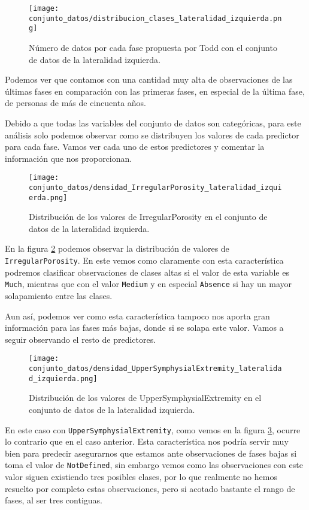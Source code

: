 \begin{figure}[H]
	\centering
	\texttt{[image: conjunto\_datos/distribucion\_clases\_lateralidad\_izquierda.png]}
	\caption{Número de datos por cada fase propuesta por Todd con el conjunto de datos de la lateralidad izquierda.}
	\label{fig:conteo_l0}
\end{figure}

Podemos ver que contamos con una cantidad muy alta de observaciones de las últimas fases en comparación con las primeras fases, en especial de la última fase, de personas de más de cincuenta años.

Debido a que todas las variables del conjunto de datos son categóricas, para este análisis solo podemos observar como se distribuyen los valores de cada predictor para cada fase. Vamos ver cada uno de estos predictores y comentar la información que nos proporcionan.

\begin{figure}[H]
	\centering
	\texttt{[image: conjunto\_datos/densidad\_IrregularPorosity\_lateralidad\_izquierda.png]}
	\caption{Distribución de los valores de IrregularPorosity en el conjunto de datos de la lateralidad izquierda.}
	\label{fig:densidad_IrregularPorosity_lateralidad_izquierda}
\end{figure}

En la figura \ref{fig:densidad_IrregularPorosity_lateralidad_izquierda} podemos observar la distribución de valores de \texttt{IrregularPorosity}. En este vemos como claramente con esta característica podremos clasificar observaciones de clases altas si el valor de esta variable es \texttt{Much}, mientras que con el valor \texttt{Medium} y en especial \texttt{Absence} si hay un mayor solapamiento entre las clases.

Aun así, podemos ver como esta característica tampoco nos aporta gran información para las fases más bajas, donde si se solapa este valor. Vamos a seguir observando el resto de predictores.

\begin{figure}[H]
	\centering
	\texttt{[image: conjunto\_datos/densidad\_UpperSymphysialExtremity\_lateralidad\_izquierda.png]}
	\caption{Distribución de los valores de UpperSymphysialExtremity en el conjunto de datos de la lateralidad izquierda.}
	\label{fig:densidad_UpperSymphysialExtremity_lateralidad_izquierda}
\end{figure}

En este caso con \texttt{UpperSymphysialExtremity}, como vemos en la figura \ref{fig:densidad_UpperSymphysialExtremity_lateralidad_izquierda}, ocurre lo contrario que en el caso anterior. Esta característica nos podría servir muy bien para predecir asegurarnos que estamos ante observaciones de fases bajas si toma el valor de \texttt{NotDefined}, sin embargo vemos como las observaciones con este valor siguen existiendo tres posibles clases, por lo que realmente no hemos resuelto por completo estas observaciones, pero si acotado bastante el rango de fases, al ser tres contiguas.

